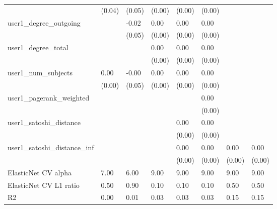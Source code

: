 \begin{table}
\begin{center}
\begin{tabular}{llllllll}
                                               & (0.04)  & (0.05)  & (0.00)  & (0.00)  & (0.00)   &           &          \\
user1_degree_outgoing                          &         & -0.02   & 0.00    & 0.00    & 0.00     &           &          \\
                                               &         & (0.05)  & (0.00)  & (0.00)  & (0.00)   &           &          \\
user1_degree_total                             &         &         & 0.00    & 0.00    & 0.00     &           &          \\
                                               &         &         & (0.00)  & (0.00)  & (0.00)   &           &          \\
user1_num_subjects                             & 0.00    & -0.00   & 0.00    & 0.00    & 0.00     &           &          \\
                                               & (0.00)  & (0.05)  & (0.00)  & (0.00)  & (0.00)   &           &          \\
user1_pagerank_weighted                        &         &         &         &         & 0.00     &           &          \\
                                               &         &         &         &         & (0.00)   &           &          \\
user1_satoshi_distance                         &         &         &         & 0.00    & 0.00     &           &          \\
                                               &         &         &         & (0.00)  & (0.00)   &           &          \\
user1_satoshi_distance_inf                     &         &         &         & 0.00    & 0.00     & 0.00      & 0.00     \\
                                               &         &         &         & (0.00)  & (0.00)   & (0.00)    & (0.00)   \\
ElasticNet CV alpha                            & 7.00    & 6.00    & 9.00    & 9.00    & 9.00     & 9.00      & 9.00     \\
ElasticNet CV  L1 ratio                        & 0.50    & 0.90    & 0.10    & 0.10    & 0.10     & 0.50      & 0.50     \\
R2                                             & 0.00    & 0.01    & 0.03    & 0.03    & 0.03     & 0.15      & 0.15     \\

\end{tabular}
\end{center}
\end{table}
